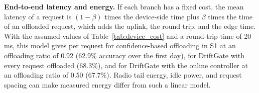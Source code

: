 \textbf{End-to-end latency and energy.} If each branch has a fixed cost, the mean latency of a request is $(1-\beta)$ times the device-side time plus $\beta$ times the time of an offloaded request, which adds the uplink, the round trip, and the edge time. With the assumed values of Table~\ref{tab:device_cost} and a round-trip time of 20\,ms, this model gives  per request for confidence-based offloading in S1 at an offloading ratio of 0.92 (62.9\% accuracy over the first day),  for DriftGate with every request offloaded (68.3\%), and  for DriftGate with the online controller at an offloading ratio of 0.50 (67.7\%). Radio tail energy, idle power, and request spacing can make measured energy differ from such a linear model. 
